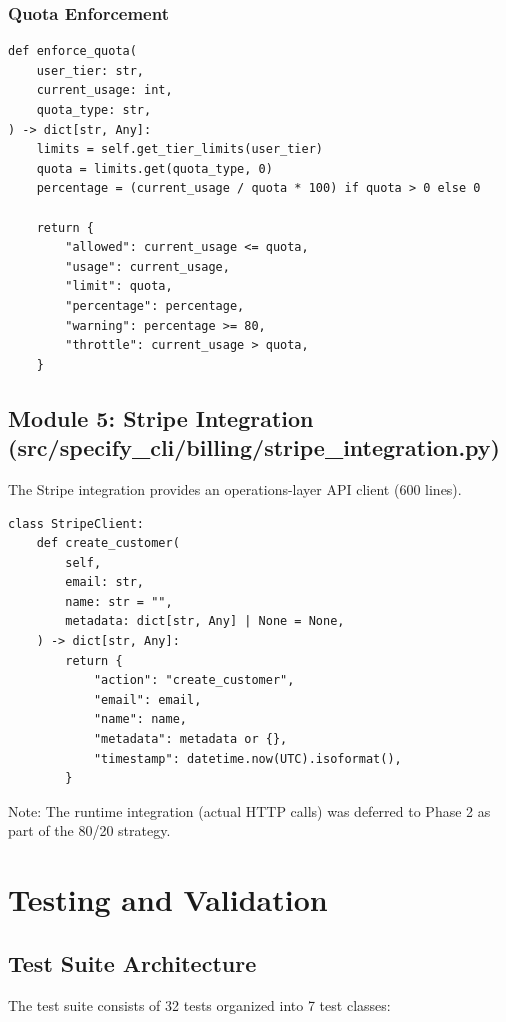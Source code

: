 \documentclass[12pt]{report}
\begin{document}
\subsection{Quota Enforcement}

\begin{lstlisting}
def enforce_quota(
    user_tier: str,
    current_usage: int,
    quota_type: str,
) -> dict[str, Any]:
    limits = self.get_tier_limits(user_tier)
    quota = limits.get(quota_type, 0)
    percentage = (current_usage / quota * 100) if quota > 0 else 0

    return {
        "allowed": current_usage <= quota,
        "usage": current_usage,
        "limit": quota,
        "percentage": percentage,
        "warning": percentage >= 80,
        "throttle": current_usage > quota,
    }
\end{lstlisting}

\section{Module 5: Stripe Integration (src/specify\_cli/billing/stripe\_integration.py)}

The Stripe integration provides an operations-layer API client (600 lines).

\begin{lstlisting}
class StripeClient:
    def create_customer(
        self,
        email: str,
        name: str = "",
        metadata: dict[str, Any] | None = None,
    ) -> dict[str, Any]:
        return {
            "action": "create_customer",
            "email": email,
            "name": name,
            "metadata": metadata or {},
            "timestamp": datetime.now(UTC).isoformat(),
        }
\end{lstlisting}

Note: The runtime integration (actual HTTP calls) was deferred to Phase 2 as part of the 80/20 strategy.

\chapter{Testing and Validation}

\section{Test Suite Architecture}

The test suite consists of 32 tests organized into 7 test classes:
\end{document}
